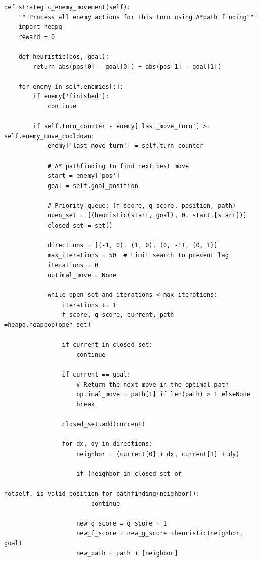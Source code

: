 \documentclass{article} %
\begin{document}
\begin{lstlisting}
def strategic_enemy_movement(self):
    """Process all enemy actions for this turn using A*path finding"""
    import heapq
    reward = 0
    
    def heuristic(pos, goal):
        return abs(pos[0] - goal[0]) + abs(pos[1] - goal[1])
    
    for enemy in self.enemies[:]:
        if enemy['finished']:
            continue
            
        if self.turn_counter - enemy['last_move_turn'] >= self.enemy_move_cooldown:
            enemy['last_move_turn'] = self.turn_counter
            
            # A* pathfinding to find next best move
            start = enemy['pos']
            goal = self.goal_position
            
            # Priority queue: (f_score, g_score, position, path)
            open_set = [(heuristic(start, goal), 0, start,[start])]
            closed_set = set()
                
            directions = [(-1, 0), (1, 0), (0, -1), (0, 1)]
            max_iterations = 50  # Limit search to prevent lag
            iterations = 0
            optimal_move = None
            
            while open_set and iterations < max_iterations:
                iterations += 1
                f_score, g_score, current, path =heapq.heappop(open_set)
                
                if current in closed_set:
                    continue
                    
                if current == goal:
                    # Return the next move in the optimal path
                    optimal_move = path[1] if len(path) > 1 elseNone
                    break
                
                closed_set.add(current)
                
                for dx, dy in directions:
                    neighbor = (current[0] + dx, current[1] + dy)
                    
                    if (neighbor in closed_set or 
                        notself._is_valid_position_for_pathfinding(neighbor)):
                        continue
                    
                    new_g_score = g_score + 1
                    new_f_score = new_g_score +heuristic(neighbor, goal)
                    new_path = path + [neighbor]
                    

\end{lstlisting}
\end{document}
